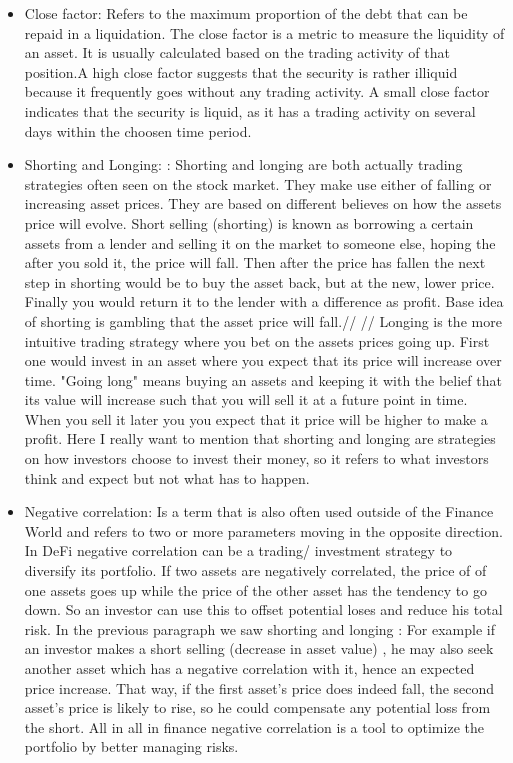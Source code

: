 \documentclass{article}
\begin{document}
\begin{itemize}
\item {Close factor}: Refers to the maximum proportion of the debt that can be repaid in a liquidation. The close factor is a metric to measure the liquidity of an asset. It is usually calculated based on the trading activity of that position.A high close factor suggests that the security is rather illiquid because it frequently goes without any trading activity. A small close factor indicates that the security is liquid, as it has a trading activity on several days within the choosen time period.

\item {Shorting and Longing: }: Shorting and longing are both actually trading strategies often seen on the stock market. They make use either of falling or increasing asset prices. They are based on different believes on how the assets price will evolve. Short selling (shorting) is known as borrowing a certain assets from a lender and selling it on the market to someone else, hoping the after you sold it, the price will fall. Then after the price has fallen the next step in shorting would be to buy the asset back, but at the new, lower price. Finally you would return it to the lender with a difference as profit. Base idea of shorting is gambling that the asset price will fall.//
//
Longing is the more intuitive trading strategy where you bet on the assets prices going up. First one would invest in an asset where you expect that its price will increase over time. "Going long" means buying an assets and keeping it with the belief that its value will increase such that you will sell it at a future point in time. When you sell it later you you expect that it price will be higher to make a profit. Here I really want to mention that shorting and longing are strategies on how investors choose to invest their money, so it refers to what investors think and expect but not what has to happen.

\item {Negative correlation}: Is a term that is also often used outside of the Finance World and refers to two or more parameters moving in the opposite direction. In DeFi negative correlation can be a trading/ investment strategy to diversify its portfolio. If two assets are negatively correlated, the price of of one assets goes up while the price of the other asset has the tendency to go down. So an investor can use this to offset potential loses and reduce his total risk. In the previous paragraph we saw shorting and longing : For example if an investor makes a short selling (decrease in asset value) , he may also seek another asset which has a negative correlation with it, hence an expected price increase. That way, if the first asset's price does indeed fall, the second asset's price is likely to rise, so he could compensate any potential loss from the short. All in all in finance negative correlation is a tool to optimize the portfolio by better managing risks.



\end{itemize}
\end{document}

